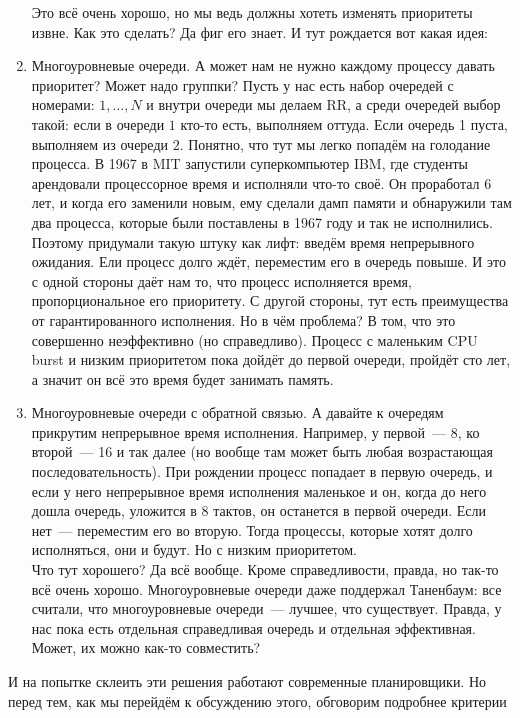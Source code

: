 \documentclass{article}
\begin{document}
\begin{enumerate}
        Это всё очень хорошо, но мы ведь должны хотеть изменять приоритеты извне. Как это сделать? Да фиг его знает. И тут рождается вот какая идея:
        \item Многоуровневые очереди. А может нам не нужно каждому процессу давать приоритет? Может надо группки? Пусть у нас есть набор очередей с номерами: $1,\ldots,N$ и внутри очереди мы делаем RR, а среди очередей выбор такой: если в очереди $1$ кто-то есть, выполняем оттуда. Если очередь 1 пуста, выполняем из очереди $2$. Понятно, что тут мы легко попадём на голодание процесса. В 1967 в MIT запустили суперкомпьютер IBM, где студенты арендовали процессорное время и исполняли что-то своё. Он проработал 6 лет, и когда его заменили новым, ему сделали дамп памяти и обнаружили там два процесса, которые были поставлены в 1967 году и так не исполнились. Поэтому придумали такую штуку как лифт: введём время непрерывного ожидания. Ели процесс долго ждёт, переместим его в очередь повыше. И это с одной стороны даёт нам то, что процесс исполняется время, пропорциональное его приоритету. С другой стороны, тут есть преимущества от гарантированного исполнения. Но в чём проблема? В том, что это совершенно неэффективно (но справедливо). Процесс с маленьким CPU burst и низким приоритетом пока дойдёт до первой очереди, пройдёт сто лет, а значит он всё это время будет занимать память.
        \item Многоуровневые очереди с обратной связью. А давайте к очередям прикрутим непрерывное время исполнения. Например, у первой~--- 8, ко второй~--- 16 и так далее (но вообще там может быть любая возрастающая последовательность). При рождении процесс попадает в первую очередь, и если у него непрерывное время исполнения маленькое и он, когда до него дошла очередь, уложится в 8 тактов, он останется в первой очереди. Если нет~--- переместим его во вторую. Тогда процессы, которые хотят долго исполняться, они и будут. Но с низким приоритетом.\\
        Что тут хорошего? Да всё вообще. Кроме справедливости, правда, но так-то всё очень хорошо. Многоуровневые очереди даже поддержал Таненбаум: все считали, что многоуровневые очереди~--- лучшее, что существует. Правда, у нас пока есть отдельная справедливая очередь и отдельная эффективная. Может, их можно как-то совместить?
    \end{enumerate}
    И на попытке склеить эти решения работают современные планировщики. Но перед тем, как мы перейдём к обсуждению этого, обговорим подробнее критерии
\end{document}
